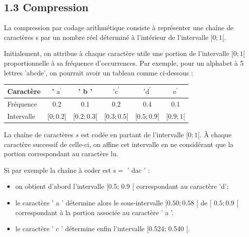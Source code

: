 \documentclass[10pt]{article}
\begin{document}
\subsection*{1.3 Compression}
La compression par codage arithmétique consiste à représenter une chaîne de caractères s par un nombre réel déterminé à l'intérieur de l'intervalle $[0 ; 1[$.

Initialement, on attribue à chaque caractère utile une portion de l'intervalle $[0 ; 1[$ proportionnelle à sa fréquence d'occurrences. Par exemple, pour un alphabet à 5 lettres 'abcde', on pourrait avoir un tableau comme ci-dessous :

\begin{center}
\begin{tabular}{|l|c|c|c|c|c|}
\hline
Caractère & ' $\mathrm{a}^{\prime}$ & ' b ' & $\mathrm{'c}^{\prime}$ & $\mathrm{'d}^{\prime}$ & $\mathrm{e}^{\prime}$ \\
\hline
Fréquence & 0.2 & 0.1 & 0.2 & 0.4 & 0.1 \\
\hline
Intervalle & $[0 ; 0.2[$ & $[0.2 ; 0.3[$ & $[0.3 ; 0.5[$ & $[0.5 ; 0.9[$ & $[0.9 ; 1[$ \\
\hline
\end{tabular}
\end{center}

La chaîne de caractères $s$ est codée en partant de l'intervalle $[0 ; 1[$. À chaque caractère successif de celle-ci, on affine cet intervalle en ne considérant que la portion correspondant au caractère lu.

Si par exemple la chaîne à coder est $\mathrm{s}=$ ' dac ' :

\begin{itemize}
  \item on obtient d'abord l'intervalle [0.5; 0.9 [ correspondant au caractère 'd';
  \item le caractère ' a ' détermine alors le sous-intervalle $[0.50 ; 0.58$ [ de [ $0.5 ; 0.9$ [ correspondant à la portion associée au caractère ' a '.
  \item le caractère ' $c$ ' détermine enfin l'intervalle [0.524; 0.540 [.
\end{itemize}
\end{document}
